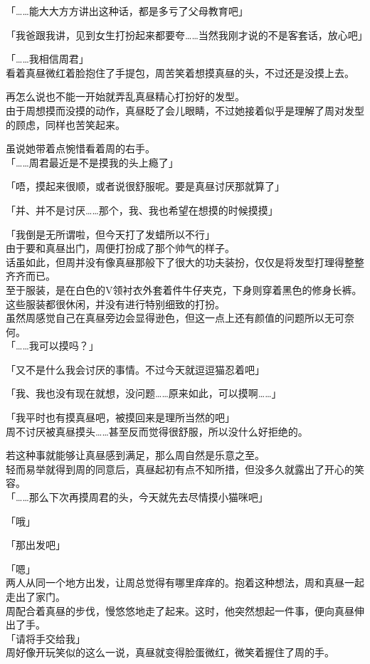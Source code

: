 「……能大大方方讲出这种话，都是多亏了父母教育吧」

「我爸跟我讲，见到女生打扮起来都要夸……当然我刚才说的不是客套话，放心吧」

「……我相信周君」\\

看着真昼微红着脸抱住了手提包，周苦笑着想摸真昼的头，不过还是没摸上去。

再怎么说也不能一开始就弄乱真昼精心打扮好的发型。\\

由于周想摸而没摸的动作，真昼眨了会儿眼睛，不过她接着似乎是理解了周对发型的顾虑，同样也苦笑起来。

虽说她带着点惋惜看着周的右手。\\

「……周君最近是不是摸我的头上瘾了」

「唔，摸起来很顺，或者说很舒服呢。要是真昼讨厌那就算了」

「并、并不是讨厌……那个，我、我也希望在想摸的时候摸摸」

「我倒是无所谓啦，但今天打了发蜡所以不行」\\

由于要和真昼出门，周便打扮成了那个帅气的样子。\\

话虽如此，但周并没有像真昼那般下了很大的功夫装扮，仅仅是将发型打理得整整齐齐而已。\\

至于服装，是在白色的V领衬衣外套着件牛仔夹克，下身则穿着黑色的修身长裤。这些服装都很休闲，并没有进行特别细致的打扮。\\

虽然周感觉自己在真昼旁边会显得逊色，但这一点上还有颜值的问题所以无可奈何。\\

「……我可以摸吗？」

「又不是什么我会讨厌的事情。不过今天就逗逗猫忍着吧」

「我、我也没有现在就想，没问题……原来如此，可以摸啊……」

「我平时也有摸真昼吧，被摸回来是理所当然的吧」\\

周不讨厌被真昼摸头……甚至反而觉得很舒服，所以没什么好拒绝的。

若这种事就能够让真昼感到满足，那么周自然是乐意之至。\\

轻而易举就得到周的同意后，真昼起初有点不知所措，但没多久就露出了开心的笑容。\\

「……那么下次再摸周君的头，今天就先去尽情摸小猫咪吧」

「哦」

「那出发吧」

「嗯」\\

两人从同一个地方出发，让周总觉得有哪里痒痒的。抱着这种想法，周和真昼一起走出了家门。\\

周配合着真昼的步伐，慢悠悠地走了起来。这时，他突然想起一件事，便向真昼伸出了手。\\

「请将手交给我」\\

周好像开玩笑似的这么一说，真昼就变得脸蛋微红，微笑着握住了周的手。

